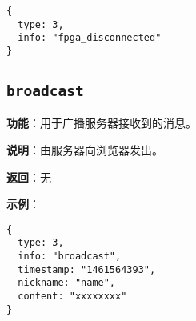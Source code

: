 \documentclass{article}
\begin{document}
\begin{lstlisting}[style=json]
{
  type: 3,
  info: "fpga_disconnected"
}
\end{lstlisting}

\subsection{\texttt{broadcast}}
\label{info:broadcast}

\noindent\textbf{功能}：用于广播服务器接收到的消息。

\noindent\textbf{说明}：由服务器向浏览器发出。

\noindent\textbf{返回}：无

\noindent\textbf{示例}：

\begin{lstlisting}[style=json]
{
  type: 3,
  info: "broadcast",
  timestamp: "1461564393",
  nickname: "name",
  content: "xxxxxxxx"
}
\end{lstlisting}
\end{document}
